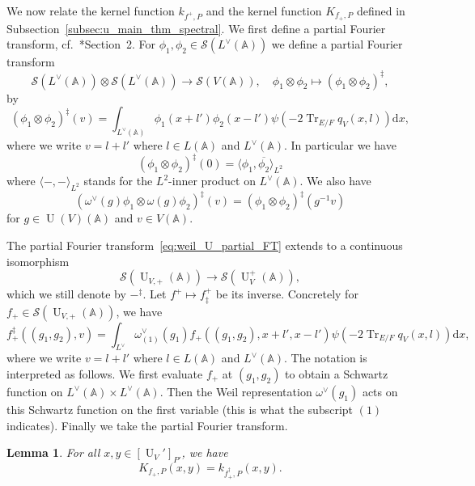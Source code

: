 \documentclass[letterpaper,11pt]{amsart}
\newcommand{\bA}{\mathbb{A}}
\newcommand{\cS}{\mathcal{S}}
\newcommand{\rd}{\mathrm{d}}
\newcommand{\<}{\negthickspace}
\DeclareMathOperator{\Tr}{Tr}
\DeclareMathOperator{\U}{U}
\theoremstyle{definition}
\theoremstyle{plain}
\newtheorem{lemma}[definition]{Lemma}
\theoremstyle{remark}
\numberwithin{equation}{section}
\begin{document}
We now relate the kernel function $k_{f^+, P}$ and the kernel function
$K_{f_+, P}$ defined in Subsection~\ref{subsec:u_main_thm_spectral}. We
first define a partial Fourier transform, cf.~\cite{Li92}*{Section~2}.
For $\phi_1, \phi_2 \in
\cS(L^\vee(\bA))$ we define a partial Fourier transform
    \begin{equation}    \label{eq:weil_U_partial_FT}
    \cS(L^\vee(\bA)) \otimes \cS(L^\vee(\bA)) \to
    \cS(V(\bA)), \quad \phi_1 \otimes \phi_2 \mapsto (\phi_1 \otimes \phi_2)^\ddag,
    \end{equation}
by
    \begin{equation}    \label{eq:weil_U_partial_FT_function}
    (\phi_1 \otimes \phi_2)^{\ddag}(v) =
    \int_{L^\vee(\bA)} \phi_1(x + l') \phi_2(x- l')
    \psi(- 2 \Tr_{E/F} q_V(x, l)) \rd x,
    \end{equation}
where we write $v = l + l'$ where $l \in L(\bA)$ and
$L^\vee(\bA)$. In particular we have
    \[
    (\phi_1 \otimes \phi_2)^{\ddag}(0) = \langle \phi_1, \overline{\phi_2} \rangle_{L^2}
    \]
where $\langle-, -\rangle_{L^2}$ stands for the $L^2$-inner product on $L^\vee(\bA)$.
We also have
    \[
    (\omega^\vee(g) \phi_1 \otimes \omega(g) \phi_2)^\ddag(v) =
    (\phi_1 \otimes \phi_2)^\ddag(g^{-1}v)
    \]
for $g \in \U(V)(\bA)$ and $v \in V(\bA)$.


The partial Fourier transform~\eqref{eq:weil_U_partial_FT} extends to a
continuous isomorphism
    \[
    \cS(\U_{V,+}(\bA)) \to \cS(\U_{V}^+(\bA)),
    \]
which we still denote by $-^\ddag$. Let $f^+ \mapsto f^+_{\ddag}$ be its
inverse. Concretely for $f_+ \in \cS(\U_{V, +}(\bA))$,
we have
    \begin{equation}    \label{eq:global_ddag_map}
    f_+^\ddag((g_1, g_2), v) = \int_{L^\vee}
    \omega^\vee_{(1)}(g_1) f_+((g_1, g_2), x+l', x-l')
    \psi( - 2 \Tr_{E/F} q_V(x, l) ) \rd x,
    \end{equation}
where we write $v = l + l'$ where $l \in L(\bA)$ and
$L^\vee(\bA)$. The notation is interpreted as follows. We first evaluate $f_+$ at
$(g_1, g_2)$ to obtain a Schwartz function on $L^\vee(\bA) \times L^\vee(\bA)$.
Then the Weil representation $\omega^\vee(g_1)$ acts on this Schwartz function
on the first variable (this is what the subscript $(1)$ indicates).
Finally we take the partial Fourier transform.





\begin{lemma}   \label{lemma:k=K_U}
For all $x, y \in [\U_V']_{P'}$, we have
    \[
    K_{f_+, P}(x, y) = k_{f_+^\dag, P}(x, y).
    \]
\end{lemma}
\end{document}
